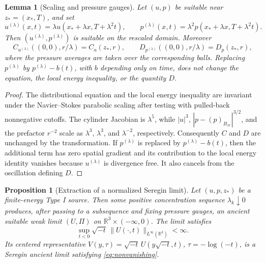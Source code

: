 \documentclass[11pt]{amsart}
\theoremstyle{plain}
\newtheorem{proposition}[theorem]{Proposition}
\newtheorem{lemma}[theorem]{Lemma}
\theoremstyle{definition}
\theoremstyle{remark}
\numberwithin{equation}{section}
\begin{document}
\begin{lemma}[Scaling and pressure gauges]\label{lem:scaling-gauges}
Let \((u,p)\) be suitable near \(z_*=(x_*,T)\), and set
\[
   u^{(\lambda)}(x,t)=\lambda u(x_*+\lambda x,T+\lambda^2t),
   \qquad
   p^{(\lambda)}(x,t)=\lambda^2 p(x_*+\lambda x,T+\lambda^2t).
\]
Then \((u^{(\lambda)},p^{(\lambda)})\) is suitable on the rescaled domain.
Moreover
\[
   C_{u^{(\lambda)}}((0,0),r/\lambda)=C_u(z_*,r),
   \qquad
   D_{p^{(\lambda)}}((0,0),r/\lambda)=D_p(z_*,r),
\]
where the pressure averages are taken over the corresponding balls.  Replacing
\(p^{(\lambda)}\) by \(p^{(\lambda)}-b(t)\), with \(b\) depending only on
time, does not change the equation, the local energy inequality, or the
quantity \(D\).
\end{lemma}

\begin{proof}
The distributional equation and the local energy inequality are invariant
under the Navier--Stokes parabolic scaling after testing with pulled-back
nonnegative cutoffs.  The cylinder Jacobian is \(\lambda^5\), while
\(|u|^3\), \(|p-(p)_{B_{\lambda r}}|^{3/2}\), and the prefactor \(r^{-2}\)
scale as \(\lambda^3\), \(\lambda^3\), and \(\lambda^{-2}\), respectively.
Consequently \(C\) and \(D\) are unchanged by the transformation.  If
\(p^{(\lambda)}\) is replaced by \(p^{(\lambda)}-b(t)\), then the additional
term has zero spatial gradient and its contribution to the local energy
identity vanishes because \(u^{(\lambda)}\) is divergence free.  It also
cancels from the oscillation defining \(D\).
\end{proof}

\begin{proposition}[Extraction of a normalized Seregin limit]
\label{prop:seregin-extraction}
Let \((u,p,z_*)\) be a finite-energy Type I source.  Then some positive
concentration sequence \(\lambda_k\downarrow0\) produces, after passing to a
subsequence and fixing pressure gauges, an ancient suitable weak limit
\((U,\Pi)\) on \(\mathbb R^3\times(-\infty,0)\).  The limit satisfies
\[
   \sup_{t<0}\sqrt{-t}\,\|U(\cdot,t)\|_{L^\infty(\mathbb R^3)}<\infty .
\]
Its centered representative \(V(y,\tau)=\sqrt{-t}\,U(y\sqrt{-t},t)\),
\(\tau=-\log(-t)\), is a Seregin ancient limit satisfying
\eqref{eq:nonvanishing}.
\end{proposition}
\end{document}
